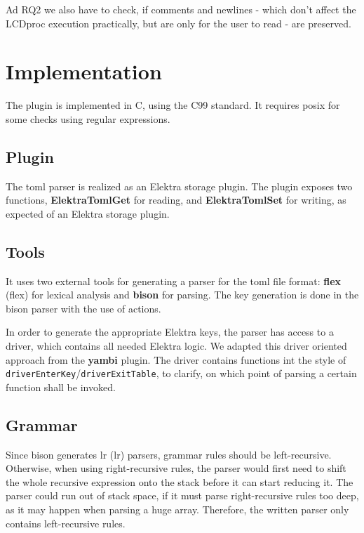 \documentclass[draft,final]{vutinfth} %
\begin{document}
Ad RQ2 we also have to check, if comments and newlines - which don't affect the LCDproc execution practically, but are only for the user to read - are preserved.

\chapter{Implementation}

The plugin is implemented in C, using the C99 standard. It requires \acrshort{posix} for some checks using regular expressions.

\section{Plugin}
The \acrshort{toml} parser is realized as an Elektra storage plugin. The plugin exposes two functions, \textbf{ElektraTomlGet} for reading, and \textbf{ElektraTomlSet} for writing, as expected of an Elektra storage plugin.

\section{Tools}
It uses two external tools for generating a parser for the toml file format: \textbf{\acrshort{flex}} (\acrlong{flex}) \cite{flexgit} for lexical analysis and \textbf{bison} \cite{bisonmain} for parsing.
The key generation is done in the bison parser with the use of actions.

In order to generate the appropriate Elektra keys, the parser has access to a driver, which contains all needed Elektra logic.
We adapted this driver oriented approach from the \textbf{yambi}\cite{Elektrayambi} plugin.
The driver contains functions int the style of \\ \texttt{driverEnterKey}/\texttt{driverExitTable}, to clarify, on which point of parsing a certain function shall be invoked.

\section{Grammar}
Since bison generates \acrshort{lr} (\acrlong{lr}) parsers, grammar rules should be left-recursive.
Otherwise, when using right-recursive rules, the parser would first need to shift the whole recursive expression onto the stack before it can start reducing it.
The parser could run out of stack space, if it must parse right-recursive rules too deep, as it may happen when parsing a huge array.
Therefore, the written parser only contains left-recursive rules.
\end{document}

